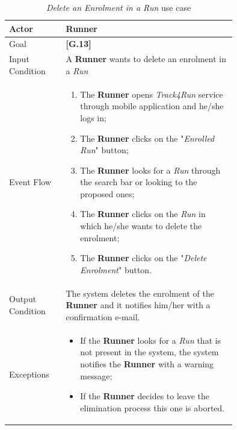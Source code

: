 \begin{center}
\begin{table}
\begin{tabular}{ | l | p{0.75\linewidth} | }
  \hline
    Actor & \textbf{Runner} \\ \hline
    Goal & \textbf{[G.13]} \\ \hline
    Input Condition & A \textbf{Runner} wants to delete an enrolment in a \textit{Run} \\ \hline
    Event Flow & \begin{minipage}[t]{0.7\textwidth}
      \begin{enumerate}
        \item The \textbf{Runner} opens \textit{Track4Run} service through mobile application and he/she logs in;
        \item The \textbf{Runner} clicks on the "\textit{Enrolled Run}" button;
        \item The \textbf{Runner} looks for a \textit{Run} through the search bar or looking to the proposed ones;
        \item The \textbf{Runner} clicks on the \textit{Run} in which he/she wants to delete the enrolment;
        \item The \textbf{Runner} clicks on the "\textit{Delete Enrolment}" button.
      \end{enumerate}
    \smallskip
  \end{minipage} \\ \hline
  Output Condition & The system deletes the enrolment of the \textbf{Runner} and it notifies him/her with a confirmation e-mail. \\ \hline
  Exceptions & \begin{minipage}[t]{0.7\textwidth}
    \begin{itemize}
      \smallskip
      \item If the \textbf{Runner} looks for a \textit{Run} that is not present in the system, the system notifies the \textbf{Runner} with a warning message;
      \item If the \textbf{Runner} decides to leave the elimination process this one is aborted.
    \end{itemize}
    \smallskip
  \end{minipage}  \\ \hline
\end{tabular}
\caption{\textit{Delete an Enrolment in a Run} use case}
\label{table:deleteEnrolmentTable}
\end{table}
\end{center}

